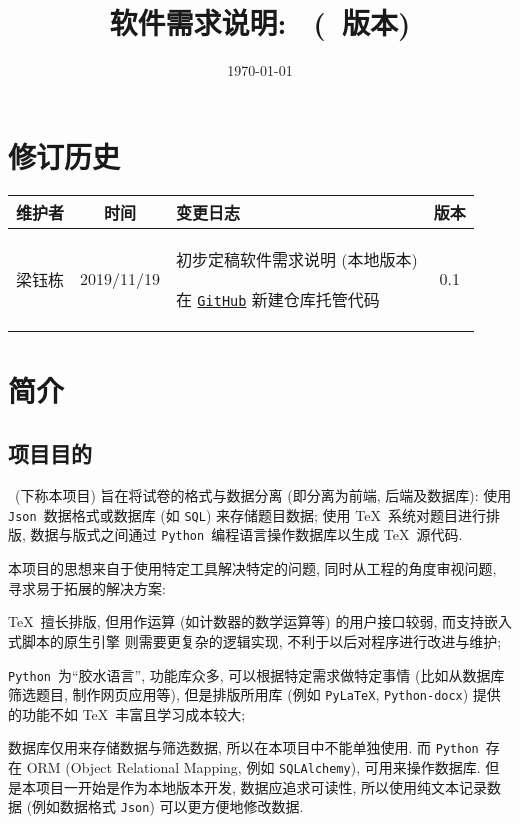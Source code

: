 \documentclass{ctexart}
\title{软件需求说明: \项目名称\ (\项目版本\ 版本)}
\author{\项目组织}
\date{\today}
\newcommand{\github}{\texttt{GitHub}}
\newcommand{\python}{\texttt{Python}}
\newcommand{\pylatex}{\texttt{PyLaTeX}}
\newcommand{\pythondocx}{\python\texttt{-docx}}
\newcommand{\json}{\texttt{Json}}
\newcommand{\sql}{\texttt{SQL}}
\newcommand{\sqlalchemy}{\sql\texttt{Alchemy}}
\begin{document}
\maketitle\tableofcontents\clearpage


\section{修订历史}\label{S:revision-history}
\begin{center}
    \begin{tabularx}{\textwidth}{ccXc}
        \toprule
            维护者 & 时间 & 变更日志 & 版本 \\
        \midrule
        \rowcolor[HTML]{EFEFEF}
            梁钰栋 & 2019/11/19 & \begin{itemize*}[itemjoin={\newline}]
                    \item 初步定稿软件需求说明 (本地版本)
                    \item 在 \href{\项目链接}{\github} 新建仓库托管代码
                \end{itemize*} & 0.1 \\
        \bottomrule
    \end{tabularx}
\end{center}



\section{简介}\label{S:introduction}
\subsection{项目目的}
\ (下称本项目) 旨在将试卷的格式与数据分离 (即分离为前端, 后端及数据库): 使用 \json\ 数据格式或数据库 (如 \sql) 来存储题目数据; 使用 \TeX\ 系统对题目进行排版, 数据与版式之间通过 \python\ 编程语言操作数据库以生成 \TeX\ 源代码.

本项目的思想来自于使用特定工具解决特定的问题, 同时从工程的角度审视问题, 寻求易于拓展的解决方案:
\begin{enumerate*}[label={(\arabic*)}]
    \item \TeX\ 擅长排版, 但用作运算 (如计数器的数学运算等) 的用户接口较弱, 而支持嵌入式脚本的原生引擎  则需要更复杂的逻辑实现, 不利于以后对程序进行改进与维护;
    \item \python\ 为``胶水语言'', 功能库众多, 可以根据特定需求做特定事情 (比如从数据库筛选题目, 制作网页应用等), 但是排版所用库 (例如 \pylatex, \pythondocx) 提供的功能不如 \TeX\ 丰富且学习成本较大;
    \item 数据库仅用来存储数据与筛选数据, 所以在本项目中不能单独使用. 而 \python\ 存在 ORM (Object Relational Mapping, 例如 \sqlalchemy\cite{sqlalchemy}), 可用来操作数据库. 但是本项目一开始是作为本地版本开发, 数据应追求可读性, 所以使用纯文本记录数据 (例如数据格式 \json) 可以更方便地修改数据.
\end{enumerate*}
\end{document}
